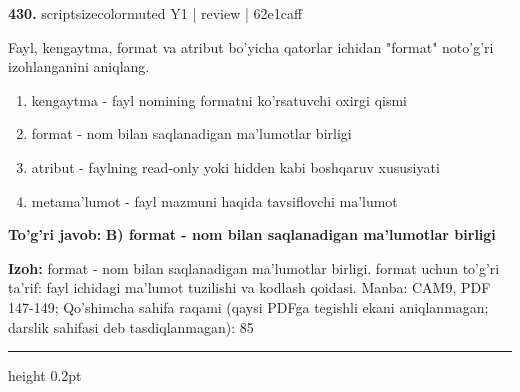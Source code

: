 \documentclass[10pt,a4paper]{article}
\begin{document}
{\bfseries\sffamily\color{ink} 430.} {scriptsizecolor{muted} Y1 | review | 62e1caff}
\par
Fayl, kengaytma, format va atribut bo'yicha qatorlar ichidan "format" noto'g'ri izohlanganini aniqlang.
\begin{enumerate}[label=\Alph*),leftmargin=9mm]
\item kengaytma - fayl nomining formatni ko'rsatuvchi oxirgi qismi
\item format - nom bilan saqlanadigan ma'lumotlar birligi
\item atribut - faylning read-only yoki hidden kabi boshqaruv xususiyati
\item metama'lumot - fayl mazmuni haqida tavsiflovchi ma'lumot
\end{enumerate}
\begin{tcolorbox}[enhanced,breakable,colback=teal!4,colframe=teal!60!black,boxrule=0.45pt,arc=1.2mm,left=2.7mm,right=2.7mm,top=1.8mm,bottom=1.8mm,before skip=2mm,after skip=2mm]
{\bfseries\sffamily\color{teal}To'g'ri javob:} \textbf{B) format - nom bilan saqlanadigan ma'lumotlar birligi}
\par\smallskip
{\bfseries Izoh:} format - nom bilan saqlanadigan ma'lumotlar birligi. format uchun to'g'ri ta'rif: fayl ichidagi ma'lumot tuzilishi va kodlash qoidasi. Manba: CAM9, PDF 147-149; Qo'shimcha sahifa raqami (qaysi PDFga tegishli ekani aniqlanmagan; darslik sahifasi deb tasdiqlanmagan): 85
\end{tcolorbox}
\vspace{2mm}\hrule height 0.2pt\vspace{3mm}
\end{document}
